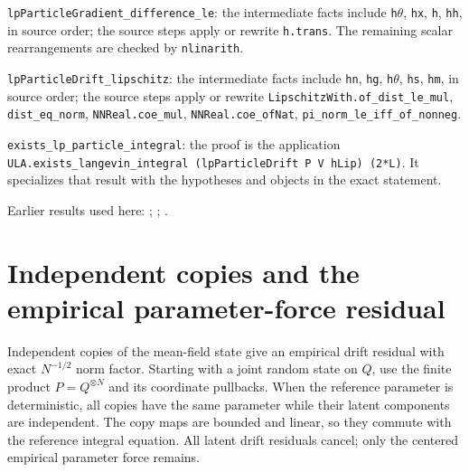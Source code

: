 \documentclass[11pt,a4paper]{report}
\begin{document}
\begin{leanbox}
\texttt{lp\allowbreak{}Particle\allowbreak{}Gradient\_\allowbreak{}difference\_\allowbreak{}le}: the intermediate facts include \texttt{h\ensuremath{\theta}}, \texttt{hx}, \texttt{h}, \texttt{hh}, in source order; the source steps apply or rewrite \texttt{h.\allowbreak{}trans}. The remaining scalar rearrangements are checked by \texttt{nlinarith}.



\texttt{lp\allowbreak{}Particle\allowbreak{}Drift\_\allowbreak{}lipschitz}: the intermediate facts include \texttt{hn}, \texttt{hg}, \texttt{h\ensuremath{\theta}}, \texttt{hs}, \texttt{hm}, in source order; the source steps apply or rewrite \texttt{Lipschitz\allowbreak{}With.\allowbreak{}of\_\allowbreak{}dist\_\allowbreak{}le\_\allowbreak{}mul}, \texttt{dist\_\allowbreak{}eq\_\allowbreak{}norm}, \texttt{NNReal.\allowbreak{}coe\_\allowbreak{}mul}, \texttt{NNReal.\allowbreak{}coe\_\allowbreak{}of\allowbreak{}Nat}, \texttt{pi\_\allowbreak{}norm\_\allowbreak{}le\_\allowbreak{}iff\_\allowbreak{}of\_\allowbreak{}nonneg}.



\texttt{exists\_\allowbreak{}lp\_\allowbreak{}particle\_\allowbreak{}integral}: the proof is the application \texttt{ULA.\allowbreak{}exists\_\allowbreak{}langevin\_\allowbreak{}integral (lp\allowbreak{}Particle\allowbreak{}Drift P V h\allowbreak{}Lip) (2*L)}. It specializes that result with the hypotheses and objects in the exact statement.
\end{leanbox}


Earlier results used here: \cite[Section~3.13.5]{LangevinLean2026ULASC}; \cite[Section~3.14.3]{LangevinLean2026ULASC}; \cite[Section~3.1.1]{LangevinLean2026IPLA}.
\section{\texorpdfstring{Independent copies and the empirical parameter-force residual}{Independent copies and the empirical parameter-force residual}}
\label{proof-module-ProximalLangevin-MeanFieldCopies-lean}


Independent copies of the mean-field state give an empirical drift residual with exact \(N^{-1/2}\) norm factor. Starting with a joint random state on \(Q\), use the finite product \(P=Q^{\otimes N}\) and its coordinate pullbacks. When the reference parameter is deterministic, all copies have the same parameter while their latent components are independent. The copy maps are bounded and linear, so they commute with the reference integral equation. All latent drift residuals cancel; only the centered empirical parameter force remains.
\end{document}
